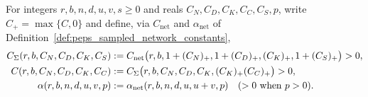\begin{definition}
    \label{def:peps_compression_constants}
    \leanok
    For integers $r,b,n,d,u,v,s\ge0$ and reals $C_N,C_D,C_K,C_C,C_S,p$, write $C_+=\max\{C,0\}$ and define, via $C_{\mathrm{net}}$ and $\alpha_{\mathrm{net}}$ of Definition~\ref{def:peps_sampled_network_constants},
    \begin{align}
        C_\Sigma(r,b,C_N,C_D,C_K,C_S) & := C_{\mathrm{net}}\bigl(r,b,1+(C_N)_+,1+(C_D)_+,(C_K)_+,1+(C_S)_+\bigr) > 0, \notag                        \\
        C(r,b,C_N,C_D,C_K,C_C)        & := C_\Sigma\bigl(r,b,C_N,C_D,C_K,(C_K)_+(C_C)_+\bigr) > 0, \notag                                           \\
        \alpha(r,b,n,d,u,v,p)         & := \alpha_{\mathrm{net}}(r,b,n,d,u,u+v,p) \quad (>0\text{ when }p>0). \label{eq:peps_compression_constants}
    \end{align}
\end{definition}

